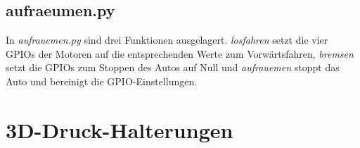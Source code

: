 \documentclass[a4paper, 12pt]{scrartcl}
\begin{document}
\subsection{aufraeumen.py}


In \textit{aufrauemen.py} sind drei Funktionen ausgelagert. \textit{losfahren} setzt die vier GPIOs der Motoren auf die entsprechenden Werte zum Vorwärtsfahren, \textit{bremsen} setzt die GPIOs zum Stoppen des Autos auf Null und \textit{aufrauemen} stoppt das Auto und bereinigt die GPIO-Einstellungen.

\section{3D-Druck-Halterungen}
\end{document}
